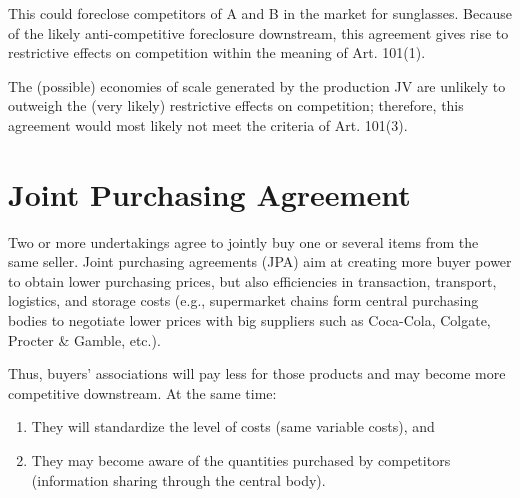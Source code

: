             This could foreclose competitors of A and B in the market for sunglasses. Because of the likely anti-competitive foreclosure downstream, this agreement gives rise to restrictive effects on competition within the meaning of Art. 101(1). 
            
            The (possible) economies of scale generated by the production JV are unlikely to outweigh the (very likely) restrictive effects on competition; therefore, this agreement would most likely not meet the criteria of Art. 101(3).

\newpage
\section{Joint Purchasing Agreement}


        Two or more undertakings agree to jointly buy one or several items from the same seller. Joint purchasing agreements (JPA) aim at creating more buyer power to obtain lower purchasing prices, but also efficiencies in transaction, transport, logistics, and storage costs (e.g., supermarket chains form central purchasing bodies to negotiate lower prices with big suppliers such as Coca-Cola, Colgate, Procter \& Gamble, etc.).

        Thus, buyers’ associations will pay less for those products and may become more competitive downstream. At the same time:
        \begin{enumerate}[label=\alph*)]
            \item They will standardize the level of costs (same variable costs), and
            \item They may become aware of the quantities purchased by competitors (information sharing through the central body).
        \end{enumerate}
        

